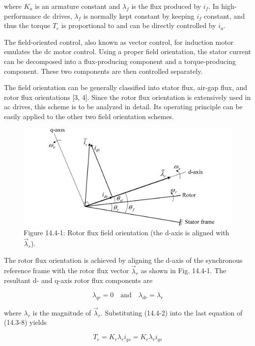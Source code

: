 \documentclass[letterpaper,12pt]{article}
\begin{document}
where $K_a$ is an armature constant and $\lambda_f$ is the flux produced by $i_f$. In high-performance dc drives, $\lambda_f$ is normally kept constant by keeping $i_f$ constant, and thus the torque $T_e$ is proportional to and can be directly controlled by $i_a$.

The field-oriented control, also known as vector control, for induction motor emulates the dc motor control. Using a proper field orientation, the stator current can be decomposed into a flux-producing component and a torque-producing component. These two components are then controlled separately.

The field orientation can be generally classified into stator flux, air-gap flux, and rotor flux orientations [3, 4]. Since the rotor flux orientation is extensively used in ac drives, this scheme is to be analyzed in detail. Its operating principle can be easily applied to the other two field orientation schemes.

\begin{figure}[h]
\centering
\includegraphics{graficos/img11.jpg}
\caption{Figure 14.4-1: Rotor flux field orientation (the d-axis is aligned with $\vec{\lambda}_r$).}
\end{figure}
\FloatBarrier

The rotor flux orientation is achieved by aligning the d-axis of the synchronous reference frame with the rotor flux vector $\vec{\lambda}_r$ as shown in Fig. 14.4-1. The resultant d- and q-axis rotor flux components are

\begin{equation}
\lambda_{qr} = 0 \quad \text{and} \quad \lambda_{dr} = \lambda_r \tag{14.4-2}
\end{equation}

where $\lambda_r$ is the magnitude of $\vec{\lambda}_r$. Substituting (14.4-2) into the last equation of (14.3-8) yields

\begin{equation}
T_e = K_r \lambda_r i_{qs} = K_r \lambda_r i_{qs} \tag{14.4-3}
\end{equation}
\end{document}
